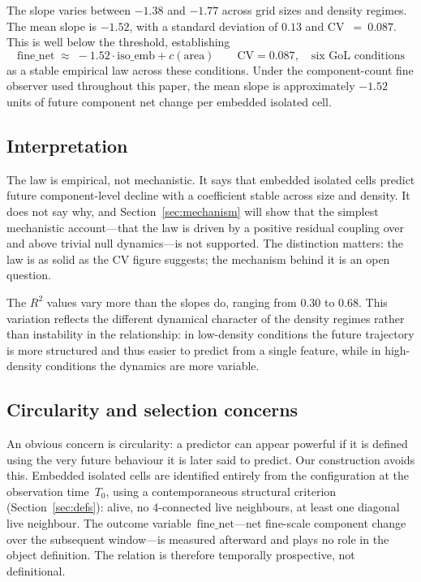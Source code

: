 \documentclass[11pt,a4paper]{article}
\newcommand{\iso}{\mathrm{iso\_emb}}
\newcommand{\fnet}{\mathrm{fine\_net}}
\begin{document}
The slope varies between $-1.38$ and $-1.77$ across grid sizes and density
regimes.
The mean slope is $-1.52$, with a standard deviation of $0.13$ and
CV~$=~0.087$.
This is well below the threshold, establishing
\begin{equation}
\label{eq:law}
\fnet \;\approx\; -1.52\cdot\iso + c(\text{area})
\qquad\text{CV}=0.087,\quad\text{six GoL conditions}
\end{equation}
as a stable empirical law across these conditions.
Under the component-count fine observer used throughout this paper, the mean
slope is approximately $-1.52$ units of future component net change per
embedded isolated cell.

\subsection{Interpretation}

The law is empirical, not mechanistic.
It says that embedded isolated cells predict future component-level decline
with a coefficient stable across size and density.
It does not say why, and Section~\ref{sec:mechanism} will show that the
simplest mechanistic account---that the law is driven by a positive residual
coupling over and above trivial null dynamics---is not supported.
The distinction matters: the law is as solid as the CV figure suggests; the
mechanism behind it is an open question.

The $R^2$ values vary more than the slopes do, ranging from 0.30 to 0.68.
This variation reflects the different dynamical character of the density
regimes rather than instability in the relationship: in low-density
conditions the future trajectory is more structured and thus easier to
predict from a single feature, while in high-density conditions the
dynamics are more variable.

\subsection{Circularity and selection concerns}

An obvious concern is circularity: a predictor can appear powerful if it is
defined using the very future behaviour it is later said to predict.
Our construction avoids this.
Embedded isolated cells are identified entirely from the configuration at the
observation time~$T_0$, using a contemporaneous structural criterion
(Section~\ref{sec:defs}): alive, no 4-connected live neighbours, at least one
diagonal live neighbour.
The outcome variable~$\fnet$---net fine-scale component change over the
subsequent window---is measured afterward and plays no role in the object
definition.
The relation is therefore temporally prospective, not definitional.
\end{document}
